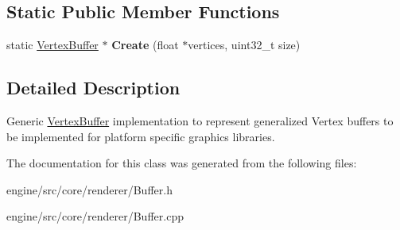 \subsection*{Static Public Member Functions}
\begin{DoxyCompactItemize}
\item
\mbox{\label{classengine_1_1renderer_1_1VertexBuffer_ad7590ff8837ebcf2ed645f4a379e04d8}}
static \hyperlink{classengine_1_1renderer_1_1VertexBuffer}{Vertex\+Buffer} $\ast$ {\bfseries Create} (float $\ast$vertices, uint32\+\_\+t size)
\end{DoxyCompactItemize}


\subsection{Detailed Description}
Generic \hyperlink{classengine_1_1renderer_1_1VertexBuffer}{Vertex\+Buffer} implementation to represent generalized Vertex buffers to be implemented for platform specific graphics libraries.

The documentation for this class was generated from the following files\+:\begin{DoxyCompactItemize}
\item
engine/src/core/renderer/Buffer.\+h\item
engine/src/core/renderer/Buffer.\+cpp\end{DoxyCompactItemize}
